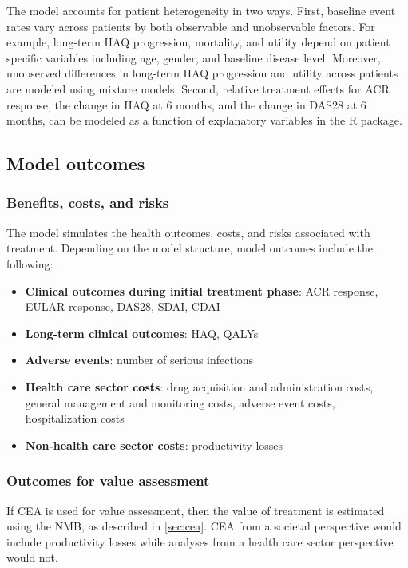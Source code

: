 \documentclass[11pt,final,fleqn]{article}\usepackage[]{graphicx}\usepackage[]{color}
\theoremstyle{plain}
\newcommand\R{{\textsf{R}}}
\begin{document}
The model accounts for patient heterogeneity in two ways. First, baseline event rates vary across patients by both observable and unobservable factors. For example, long-term HAQ progression, mortality, and utility depend on patient specific variables including age, gender, and baseline disease level. Moreover, unobserved differences in long-term HAQ progression and utility across patients are modeled using mixture models. Second, relative treatment effects for ACR response, the change in HAQ at 6 months, and the change in DAS28 at 6 months, can be modeled as a function of explanatory variables in the \R{} package. 

\subsection{Model outcomes}\label{model-outcomes}
\subsubsection{Benefits, costs, and risks} \label{subsec:benefits-risks-costs}
The model simulates the health outcomes, costs, and risks associated with treatment. Depending on the model structure, model outcomes include the following:
\begin{itemize}
\item \textbf{Clinical outcomes during initial treatment phase}: ACR response, EULAR response, DAS28, SDAI, CDAI
\item \textbf{Long-term clinical outcomes}: HAQ, QALYs
\item \textbf{Adverse events}: number of serious infections
\item \textbf{Health care sector costs}: drug acquisition and administration costs, general management and monitoring costs, adverse event costs, hospitalization costs
\item \textbf{Non-health care sector costs}: productivity losses
\end{itemize}

\subsubsection{Outcomes for value assessment}
If CEA is used for value assessment, then the value of treatment is estimated using the NMB, as described in \autoref{sec:cea}. CEA from a societal perspective would include productivity losses while analyses from a health care sector perspective would not.
\end{document}
